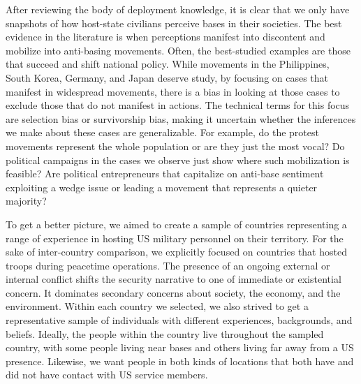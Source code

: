 After reviewing the body of deployment knowledge, it is clear that we only have snapshots of how host-state civilians perceive bases in their societies. The best evidence in the literature is when perceptions manifest into discontent and mobilize into anti-basing movements. Often, the best-studied examples are those that succeed and shift national policy.  While movements in the Philippines, South Korea, Germany, and Japan deserve study, by focusing on cases that manifest in widespread movements, there is a bias in looking at those cases to exclude those that do not manifest in actions. \cite{Geddes1990} The technical terms for this focus are selection bias or survivorship bias, making it uncertain whether the inferences we make about these cases are generalizable. For example, do the protest movements represent the whole population or are they just the most vocal? Do political campaigns in the cases we observe just show where such mobilization is feasible? Are political entrepreneurs that capitalize on anti-base sentiment exploiting a wedge issue or leading a movement that represents a quieter majority?

To get a better picture, we aimed to create a sample of countries representing a range of experience in hosting US military personnel on their territory. For the sake of inter-country comparison, we explicitly focused on countries that hosted troops during peacetime operations. The presence of an ongoing external or internal conflict shifts the security narrative to one of immediate or existential concern. It dominates secondary concerns about society, the economy, and the environment. Within each country we selected, we also strived to get a representative sample of individuals with different experiences, backgrounds, and beliefs. Ideally, the people within the country live throughout the sampled country, with some people living near bases and others living far away from a US presence. Likewise, we want people in both kinds of locations that both have and did not have contact with US service members. 

